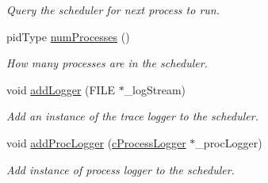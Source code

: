 \begin{DoxyCompactItemize}
\begin{DoxyCompactList}\small\item\em \-Query the scheduler for next process to run. \end{DoxyCompactList}\item 
pid\-Type \hyperlink{classcRoundRobin_afa0cdfcfc0b8222d39ad5e9c23db1f25}{num\-Processes} ()
\begin{DoxyCompactList}\small\item\em \-How many processes are in the scheduler. \end{DoxyCompactList}\item 
void \hyperlink{classcRoundRobin_a6e0d0ec272a4f7ffe03166b1ff08276b}{add\-Logger} (\-F\-I\-L\-E $\ast$\-\_\-log\-Stream)
\begin{DoxyCompactList}\small\item\em \-Add an instance of the trace logger to the scheduler. \end{DoxyCompactList}\item 
void \hyperlink{classcRoundRobin_a728fa415647d6c71b32ee8d4a04580e1}{add\-Proc\-Logger} (\hyperlink{classcProcessLogger}{c\-Process\-Logger} $\ast$\-\_\-proc\-Logger)
\begin{DoxyCompactList}\small\item\em \-Add instance of process logger to the scheduler. \end{DoxyCompactList}\end{DoxyCompactItemize}
